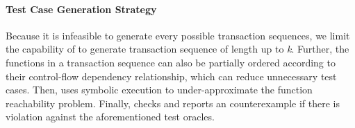\paragraph{Test Case Generation Strategy}
Because it is infeasible to generate every possible transaction sequences,
we limit the capability of \spcon to generate transaction sequence of length up to \textit{k}.
Further, the functions in a transaction sequence can also be partially ordered according to their control-flow dependency relationship, which can reduce unnecessary test cases.
Then, \spcon uses symbolic execution to under-approximate the function reachability problem.
Finally, \spcon checks and reports an counterexample if there is violation against the aforementioned test oracles.
%
%
%
